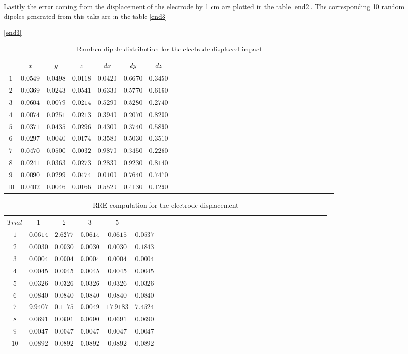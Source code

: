 Lasttly the error coming from the displacement of the electrode by 1 cm are plotted in the table \ref{end2}. The corresponding 10 random dipoles generated from this taks are in the table \ref{end3}
 \begin{table}[!htbp]
\centering
\caption{Random dipole distribution for the electrode displaced impact}\ref{end3}
\label{table:5}
\begin{tabular}{c c c c c c c c c c c c c c c c c c c c c c c c c c c c c c c } 
   \hline 
$   $&$x$&$y$&$z$&$dx$&$dy$&$dz$\\
   \hline 
$1$&$ 0.0549$&$ 0.0498$&$ 0.0118$&$ 0.0420$&$ 0.6670$&$ 0.3450$\\
$2$&$ 0.0369$&$ 0.0243$&$ 0.0541$&$ 0.6330$&$ 0.5770$&$ 0.6160$\\
$3$&$ 0.0604$&$ 0.0079$&$ 0.0214$&$ 0.5290$&$ 0.8280$&$ 0.2740$\\
$4$&$ 0.0074$&$ 0.0251$&$ 0.0213$&$ 0.3940$&$ 0.2070$&$ 0.8200$\\
$5$&$ 0.0371$&$ 0.0435$&$ 0.0296$&$ 0.4300$&$ 0.3740$&$ 0.5890$\\
$6$&$ 0.0297$&$ 0.0040$&$ 0.0174$&$ 0.3580$&$ 0.5030$&$ 0.3510$\\
$7$&$ 0.0470$&$ 0.0500$&$ 0.0032$&$ 0.9870$&$ 0.3450$&$ 0.2260$\\
$8$&$ 0.0241$&$ 0.0363$&$ 0.0273$&$ 0.2830$&$ 0.9230$&$ 0.8140$\\
$9$&$ 0.0090$&$ 0.0299$&$ 0.0474$&$ 0.0100$&$ 0.7640$&$ 0.7470$\\
$10$&$ 0.0402$&$ 0.0046$&$ 0.0166$&$ 0.5520$&$ 0.4130$&$ 0.1290$\\
\hline 

\end{tabular}
\end{table}


 \begin{table}[!htbp]
\centering
\caption{RRE computation for the electrode displacement}\label{end2}
\label{table:5}
\begin{tabular}{c c c c c c c c c c c c c c c c c c c c c c c c c c c c c c c } 
   \hline 
$Trial$&$1$&$2$&$3$&$5$\\
   \hline 
$1$&$ 0.0614$&$ 2.6277$&$ 0.0614$&$ 0.0615$&$ 0.0537$\\
$2$&$ 0.0030$&$ 0.0030$&$ 0.0030$&$ 0.0030$&$ 0.1843$\\
$3$&$ 0.0004$&$ 0.0004$&$ 0.0004$&$ 0.0004$&$ 0.0004$\\
$4$&$ 0.0045$&$ 0.0045$&$ 0.0045$&$ 0.0045$&$ 0.0045$\\
$5$&$ 0.0326$&$ 0.0326$&$ 0.0326$&$ 0.0326$&$ 0.0326$\\
$6$&$ 0.0840$&$ 0.0840$&$ 0.0840$&$ 0.0840$&$ 0.0840$\\
$7$&$ 9.9407$&$ 0.1175$&$ 0.0049$&$17.9183$&$ 7.4524$\\
$8$&$ 0.0691$&$ 0.0691$&$ 0.0690$&$ 0.0691$&$ 0.0690$\\
$9$&$ 0.0047$&$ 0.0047$&$ 0.0047$&$ 0.0047$&$ 0.0047$\\
$10$&$ 0.0892$&$ 0.0892$&$ 0.0892$&$ 0.0892$&$ 0.0892$\\
\hline 

\end{tabular}
\end{table}


